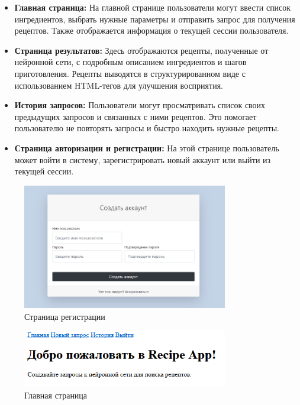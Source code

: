 {{    \begin{itemize}
        \item \textbf{Главная страница:} На главной странице пользователи могут ввести список ингредиентов, выбрать нужные параметры и отправить запрос для получения рецептов. Также отображается информация о текущей сессии пользователя.
        \item \textbf{Страница результатов:} Здесь отображаются рецепты, полученные от нейронной сети, с подробным описанием ингредиентов и шагов приготовления. Рецепты выводятся в структурированном виде с использованием HTML-тегов для улучшения восприятия.
        \item \textbf{История запросов:} Пользователи могут просматривать список своих предыдущих запросов и связанных с ними рецептов. Это помогает пользователю не повторять запросы и быстро находить нужные рецепты.
        \item \textbf{Страница авторизации и регистрации:} На этой странице пользователь может войти в систему, зарегистрировать новый аккаунт или выйти из текущей сессии.
    \end{itemize}
    \begin{figure}[H]
        \centering
        \includegraphics[width=0.8\textwidth]{assets/registration.png} 
        \caption{Страница регистрации}
    \end{figure}
    \begin{figure}[H]
        \centering
        \includegraphics[width=0.8\textwidth]{assets/index.png} 
        \caption{Главная страница}
    \end{figure}
}}
